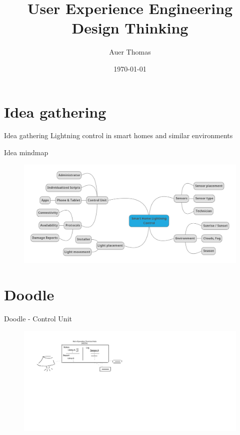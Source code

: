 \documentclass{beamer}
\title{User Experience Engineering\\Design Thinking}
\author{Auer Thomas}
\date{\today}
\begin{document}
    \frame{\titlepage}

    \begin{frame}
        \tableofcontents
    \end{frame}
    
    \section{Idea gathering}
    \begin{frame}{Idea gathering}
        Lightning control in smart homes and similar environments
    \end{frame}

    \begin{frame}{Idea mindmap}
        \begin{figure}[H]
            \centering
            \includegraphics[width=1.0\textwidth]{Ideas.png}
            \label{fig:Ideas}
        \end{figure}
    \end{frame}
        

    \section{Doodle}
    \begin{frame}{Doodle - Control Unit}
        \begin{figure}[H]
            \centering
            \includegraphics[width=2.25\textwidth]{Drawing_MOTH.png}
            \label{fig:Drawing_MOTH}
        \end{figure}
    \end{frame}
\end{document}
